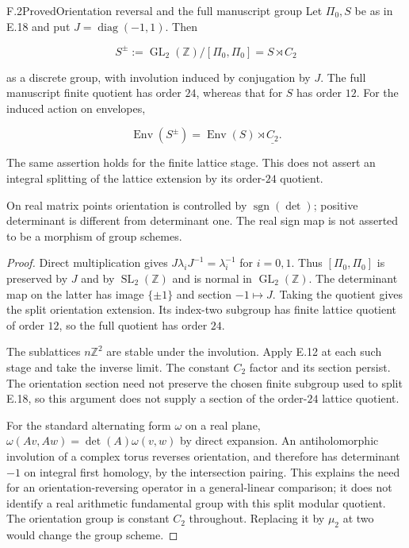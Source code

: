 \begin{statement}{F.2}{Proved}{Orientation reversal and the full manuscript group}
Let $\Pi_0,S$ be as in E.18 and put $J=\operatorname{diag}(-1,1)$.
Then

$$
S^\pm:=\operatorname{GL}_2(\mathbb Z)/[\Pi_0,\Pi_0]
       =S\rtimes C_2
$$

as a discrete group, with involution induced by conjugation by $J$.
The full manuscript finite quotient has order $24$, whereas that
for $S$ has order $12$. For the induced action on envelopes,

$$
\operatorname{Env}(S^\pm)
   =\operatorname{Env}(S)\rtimes\underline{C_2}.
$$

The same assertion holds for the finite lattice stage.
This does not assert an integral splitting of the lattice extension
by its order-$24$ quotient.

On real matrix points orientation is controlled by
$\operatorname{sgn}(\det)$; positive determinant is different from
determinant one. The real sign map is not asserted to be a
morphism of group schemes.
\end{statement}
\begin{proof}
Direct multiplication gives $J\lambda_iJ^{-1}=\lambda_i^{-1}$
for $i=0,1$. Thus $[\Pi_0,\Pi_0]$ is preserved by $J$ and by
$\operatorname{SL}_2(\mathbb Z)$ and is normal in
$\operatorname{GL}_2(\mathbb Z)$. The determinant map on the
latter has image $\{\pm1\}$ and section $-1\mapsto J$.
Taking the quotient gives the split orientation extension.
Its index-two subgroup has finite lattice quotient of order
$12$, so the full quotient has order $24$.

The sublattices $n\mathbb Z^2$ are stable under the involution.
Apply E.12 at each such stage and take the inverse limit.
The constant $C_2$ factor and its section persist.
The orientation section need not preserve the chosen finite
subgroup used to split E.18, so this argument does not supply
a section of the order-$24$ lattice quotient.

For the standard alternating form $\omega$ on a real plane,
$\omega(Av,Aw)=\det(A)\omega(v,w)$ by direct expansion.
An antiholomorphic involution of a complex torus reverses
orientation, and therefore has determinant $-1$ on integral
first homology, by the intersection pairing. This explains
the need for an orientation-reversing operator in a
general-linear comparison; it does not identify a real
arithmetic fundamental group with this split modular quotient.
The orientation group is constant $C_2$ throughout.
Replacing it by $\mu_2$ at two would change the group scheme.
\end{proof}


